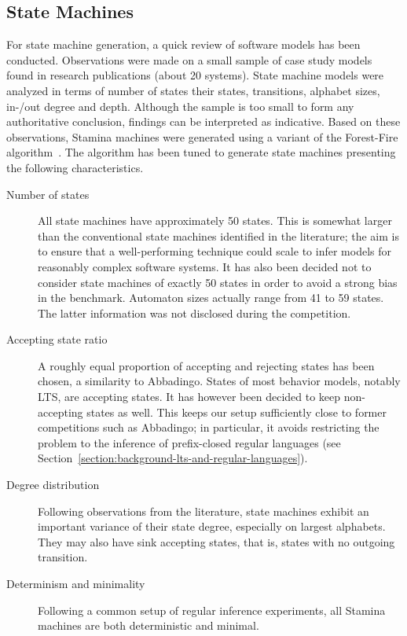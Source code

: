 \subsection{State Machines\label{subsection:stamina-machines}}

For state machine generation, a quick review of software models has been conducted. Observations were made on a small sample of case study models found in research publications (about 20 systems). State machine models were analyzed in terms of number of states their states, transitions, alphabet sizes, in-/out degree and depth. Although the sample is too small to form any authoritative conclusion, findings can be interpreted as indicative. Based on these observations, Stamina machines were generated using a variant of the Forest-Fire algorithm~\cite{Leskovec2007}. The algorithm has been tuned to generate state machines presenting the following characteristics.
\begin{description}

\item[Number of states] All state machines have approximately 50 states. This is somewhat larger than the conventional state machines identified in the literature; the aim is to ensure that a well-performing technique could scale to infer models for reasonably complex software systems. It has also been decided not to consider state machines of exactly 50 states in order to avoid a strong bias in the benchmark. Automaton sizes actually range from 41 to 59 states. The latter information was not disclosed during the competition.

\item[Accepting state ratio] A roughly equal proportion of accepting and rejecting states has been chosen, a similarity to Abbadingo. States of most behavior models, notably LTS, are accepting states. It has however been decided to keep non-accepting states as well. This keeps our setup sufficiently close to former competitions such as Abbadingo; in particular, it avoids restricting the problem to the inference of prefix-closed regular languages (see Section~\ref{section:background-lts-and-regular-languages}).

\item[Degree distribution] Following observations from the literature, state machines exhibit an important variance of their state degree, especially on largest alphabets. They may also have sink accepting states, that is, states with no outgoing transition.

\item[Determinism and minimality] Following a common setup of regular inference experiments, all Stamina machines are both deterministic and minimal.

\end{description}

